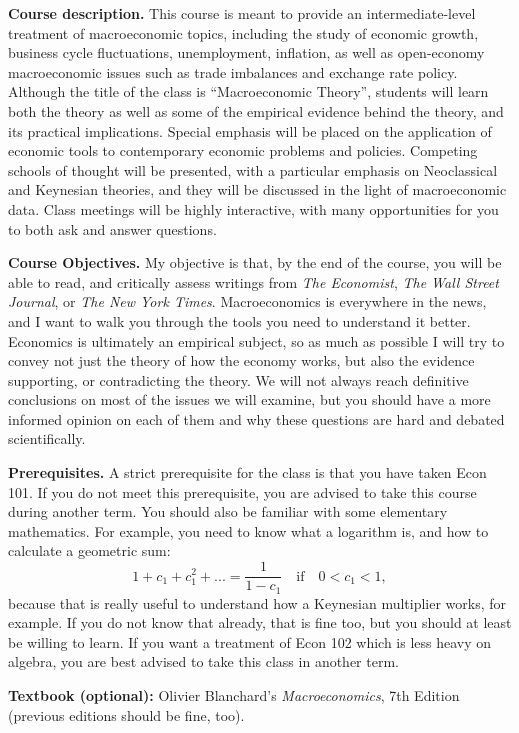 \documentclass[]{book}
\theoremstyle{definition}
\theoremstyle{definition}
\theoremstyle{definition}
\theoremstyle{remark}
\begin{document}
\textbf{Course description.} This course is meant to provide an
intermediate-level treatment of macroeconomic topics, including the
study of economic growth, business cycle fluctuations, unemployment,
inflation, as well as open-economy macroeconomic issues such as trade
imbalances and exchange rate policy. Although the title of the class is
``Macroeconomic Theory'', students will learn both the theory as well as
some of the empirical evidence behind the theory, and its practical
implications. Special emphasis will be placed on the application of
economic tools to contemporary economic problems and policies. Competing
schools of thought will be presented, with a particular emphasis on
Neoclassical and Keynesian theories, and they will be discussed in the
light of macroeconomic data. Class meetings will be highly interactive,
with many opportunities for you to both ask and answer questions.

\textbf{Course Objectives.} My objective is that, by the end of the
course, you will be able to read, and critically assess writings from
\emph{The Economist}, \emph{The Wall Street Journal}, or \emph{The New
York Times}. Macroeconomics is everywhere in the news, and I want to
walk you through the tools you need to understand it better. Economics
is ultimately an empirical subject, so as much as possible I will try to
convey not just the theory of how the economy works, but also the
evidence supporting, or contradicting the theory. We will not always
reach definitive conclusions on most of the issues we will examine, but
you should have a more informed opinion on each of them and why these
questions are hard and debated scientifically.

\textbf{Prerequisites.} A strict prerequisite for the class is that you
have taken Econ 101. If you do not meet this prerequisite, you are
advised to take this course during another term. You should also be
familiar with some elementary mathematics. For example, you need to know
what a logarithm is, and how to calculate a geometric sum:
\[1+c_1+c_1^2+...=\frac{1}{1-c_1} \quad \text{if} \quad 0<c_1<1,\]
because that is really useful to understand how a Keynesian multiplier
works, for example. If you do not know that already, that is fine too,
but you should at least be willing to learn. If you want a treatment of
Econ 102 which is less heavy on algebra, you are best advised to take
this class in another term.

\textbf{Textbook (optional):} Olivier Blanchard's \emph{Macroeconomics},
7th Edition (previous editions should be fine, too).
\end{document}
